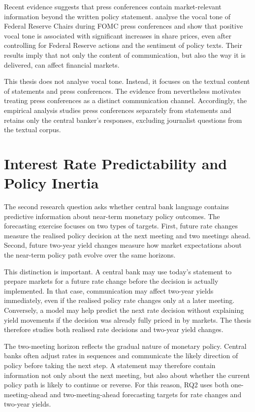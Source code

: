 Recent evidence suggests that press conferences contain market-relevant
information beyond the written policy statement. \citet{gorodnichenko2023}
analyse the vocal tone of Federal Reserve Chairs during FOMC press
conferences and show that positive vocal tone is associated with
significant increases in share prices, even after controlling for Federal
Reserve actions and the sentiment of policy texts. Their results imply
that not only the content of communication, but also the way it is
delivered, can affect financial markets.

This thesis does not analyse vocal tone. Instead, it focuses on the
textual content of statements and press conferences. The evidence from
\citet{gorodnichenko2023} nevertheless motivates treating press
conferences as a distinct communication channel. Accordingly, the
empirical analysis studies press conferences separately from statements
and retains only the central banker's responses, excluding journalist
questions from the textual corpus.


\section{Interest Rate Predictability and Policy Inertia}
\label{sec:lit_inertia}

The second research question asks whether central bank language contains
predictive information about near-term monetary policy outcomes. The
forecasting exercise focuses on two types of targets. First, future rate
changes measure the realised policy decision at the next meeting and two
meetings ahead. Second, future two-year yield changes measure how market
expectations about the near-term policy path evolve over the same
horizons.

This distinction is important. A central bank may use today’s statement
to prepare markets for a future rate change before the decision is
actually implemented. In that case, communication may affect two-year
yields immediately, even if the realised policy rate changes only at a
later meeting. Conversely, a model may help predict the next rate
decision without explaining yield movements if the decision was already
fully priced in by markets. The thesis therefore studies both realised
rate decisions and two-year yield changes.

The two-meeting horizon reflects the gradual nature of monetary policy.
Central banks often adjust rates in sequences and communicate the likely
direction of policy before taking the next step. A statement may
therefore contain information not only about the next meeting, but also
about whether the current policy path is likely to continue or reverse.
For this reason, RQ2 uses both one-meeting-ahead and two-meeting-ahead
forecasting targets for rate changes and two-year yields.

